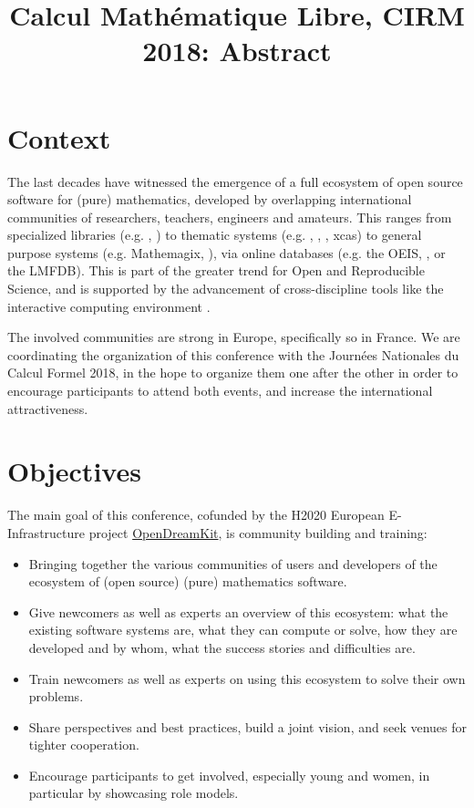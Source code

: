 \documentclass[12pt]{amsart}
\begin{document}
\title{Calcul Mathématique Libre, CIRM 2018: Abstract}
\maketitle
\thispagestyle{empty}

\section*{Context}

The last decades have witnessed the emergence of a full ecosystem of
open source software for (pure) mathematics, developed by overlapping
international communities of researchers, teachers, engineers and
amateurs. This ranges from specialized libraries (e.g. \MPIR, \Linbox)
to thematic systems (e.g. \GAP, \Pari, \Singular, xcas) to general
purpose systems (e.g. Mathemagix, \Sage), via online databases
(e.g. the OEIS, \MathHub, or the LMFDB). This is part of the greater
trend for Open and Reproducible Science, and is supported by the
advancement of cross-discipline tools like the interactive computing
environment \Jupyter.

The involved communities are strong in Europe, specifically so in
France. We are coordinating the organization of this conference with the Journées
Nationales du Calcul Formel 2018, in the hope to organize them one
after the other in order to encourage participants to attend both
events, and increase the international attractiveness.

\section*{Objectives}

The main goal of this conference, cofunded by the H2020 European
E-Infrastructure project \href{opendreamkit.org}{OpenDreamKit}, is
community building and training:
\begin{itemize}
\item Bringing together the various communities of users and
  developers of the ecosystem of (open source) (pure) mathematics
  software.
\item Give newcomers as well as experts an overview of this ecosystem:
  what the existing software systems are, what they can compute or solve, how
  they are developed and by whom, what the success stories and
  difficulties are.
\item Train newcomers as well as experts on using this ecosystem to
  solve their own problems.
\item Share perspectives and best practices, build a joint vision, and
  seek venues for tighter cooperation.
\item Encourage participants to get involved, especially young and
  women, in particular by showcasing role models.
\end{itemize}
\end{document}
